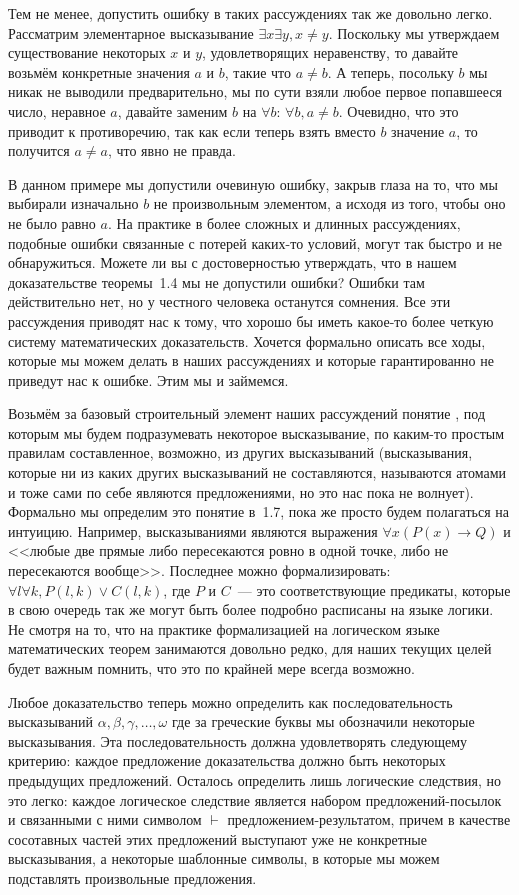 Тем не менее, допустить ошибку в таких рассуждениях так же довольно легко. Рассматрим элементарное высказывание $\exists x \exists y, x\not= y$. Поскольку мы утверждаем существование некоторых $x$ и $y$, удовлетворящих неравенству, то давайте возьмём конкретные значения $a$ и $b$, такие что $a\not= b$. А теперь, посольку $b$ мы никак не выводили предварительно, мы по сути взяли любое первое попавшееся число, неравное $a$, давайте заменим $b$ на $\forall b$: $\forall b, a\not= b$. Очевидно, что это приводит к противоречию, так как если теперь взять вместо $b$ значение $a$, то получится $a\not= a$, что явно не правда.

В данном примере мы допустили очевиную ошибку, закрыв глаза на то, что мы выбирали изначально $b$ не произвольным элементом, а исходя из того, чтобы оно не было равно $a$. На практике в более сложных и длинных рассуждениях, подобные ошибки связанные с потерей каких-то условий, могут так быстро и не обнаружиться. Можете ли вы с достоверностью утверждать, что в нашем доказательстве теоремы~1.4 мы не допустили ошибки? Ошибки там действительно нет, но у честного человека останутся сомнения. Все эти рассуждения приводят нас к тому, что хорошо бы иметь какое-то более четкую систему математических доказательств. Хочется формально описать все ходы, которые мы можем делать в наших рассуждениях и которые гарантированно не приведут нас к ошибке. Этим мы и займемся.

Возьмём за базовый строительный элемент наших рассуждений понятие , под которым мы будем подразумевать некоторое высказывание, по каким-то простым правилам составленное, возможно, из других высказываний (высказывания, которые ни из каких других высказываний не составляются, называются атомами и тоже сами по себе являются предложениями, но это нас пока не волнует). Формально мы определим это понятие в~1.7, пока же просто будем полагаться на интуицию. Например, высказываниями являются выражения $\forall x (P(x)\to Q)$ и <<любые две прямые либо пересекаются ровно в одной точке, либо не пересекаются вообще>>. Последнее можно формализировать: $\forall l \forall k, P(l, k) \lor C(l, k)$, где $P$ и $C$~--- это соответствующие предикаты, которые в свою очередь так же могут быть более подробно расписаны на языке логики. Не смотря на то, что на практике формализацией на логическом языке математических теорем занимаются довольно редко, для наших текущих целей будет важным помнить, что это по крайней мере всегда возможно.

Любое доказательство теперь можно определить как последовательность высказываний $\alpha, \beta, \gamma, \ldots, \omega$ где за греческие буквы мы обозначили некоторые высказывания. Эта последовательность должна удовлетворять следующему критерию: каждое предложение доказательства должно быть  некоторых предыдущих предложений. Осталось определить лишь логические следствия, но это легко: каждое логическое следствие является набором предложений-посылок и связанными с ними символом $\vdash$ предложением-результатом, причем в качестве сосотавных частей этих предложений выступают уже не конкретные высказывания, а некоторые шаблонные символы, в которые мы можем подставлять произвольные предложения.


